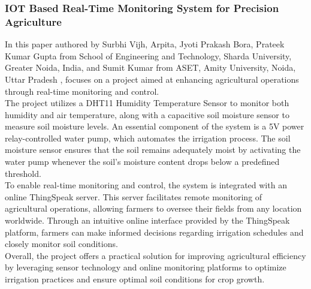 \documentclass[12pt, a4paper]{article}
\begin{document}
\subsubsection{IOT Based Real-Time Monitoring System for Precision Agriculture}
In this paper authored by Surbhi Vijh, Arpita, Jyoti Prakash Bora, Prateek Kumar Gupta from School of Engineering and Technology, Sharda University, Greater Noida, India, and Sumit Kumar from ASET, Amity University, Noida, Uttar Pradesh \cite{10463399}, focuses on a project aimed at enhancing agricultural operations through real-time monitoring and control.\\
The project utilizes a DHT11 Humidity Temperature Sensor to monitor both humidity and air temperature, along with a capacitive soil moisture sensor to measure soil moisture levels. An essential component of the system is a 5V power relay-controlled water pump, which automates the irrigation process. The soil moisture sensor ensures that the soil remains adequately moist by activating the water pump whenever the soil's moisture content drops below a predefined threshold.\\
To enable real-time monitoring and control, the system is integrated with an online ThingSpeak server. This server facilitates remote monitoring of agricultural operations, allowing farmers to oversee their fields from any location worldwide. Through an intuitive online interface provided by the ThingSpeak platform, farmers can make informed decisions regarding irrigation schedules and closely monitor soil conditions.\\
Overall, the project offers a practical solution for improving agricultural efficiency by leveraging sensor technology and online monitoring platforms to optimize irrigation practices and ensure optimal soil conditions for crop growth.
\end{document}
